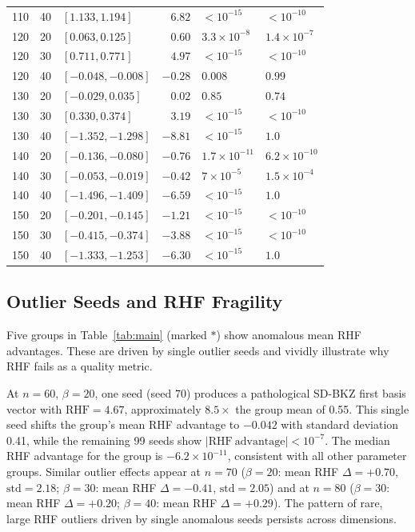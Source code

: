 \documentclass[journal=cic,version=preprint]{iacrj}
\begin{document}
\begin{table}[tbp]
\begin{tabular}{rrlrll}
110 & 40 & $[1.133, 1.194]$ & $6.82$  & $<10^{-15}$ & $<10^{-10}$ \\
120 & 20 & $[0.063, 0.125]$ & $0.60$  & $3.3\times 10^{-8}$ & $1.4\times 10^{-7}$ \\
120 & 30 & $[0.711, 0.771]$ & $4.97$  & $<10^{-15}$ & $<10^{-10}$ \\
120 & 40 & $[-0.048, -0.008]$ & $-0.28$ & $0.008$ & $0.99$ \\
130 & 20 & $[-0.029, 0.035]$ & $0.02$  & $0.85$ & $0.74$ \\
130 & 30 & $[0.330, 0.374]$ & $3.19$  & $<10^{-15}$ & $<10^{-10}$ \\
130 & 40 & $[-1.352, -1.298]$ & $-8.81$ & $<10^{-15}$ & $1.0$ \\
140 & 20 & $[-0.136, -0.080]$ & $-0.76$ & $1.7\times 10^{-11}$ & $6.2\times 10^{-10}$ \\
140 & 30 & $[-0.053, -0.019]$ & $-0.42$ & $7\times 10^{-5}$ & $1.5\times 10^{-4}$ \\
140 & 40 & $[-1.496, -1.409]$ & $-6.59$ & $<10^{-15}$ & $1.0$ \\
150 & 20 & $[-0.201, -0.145]$ & $-1.21$ & $<10^{-15}$ & $<10^{-10}$ \\
150 & 30 & $[-0.415, -0.374]$ & $-3.88$ & $<10^{-15}$ & $<10^{-10}$ \\
150 & 40 & $[-1.333, -1.253]$ & $-6.30$ & $<10^{-15}$ & $1.0$ \\
\hline
\end{tabular}
\end{table}

\subsection{Outlier Seeds and RHF Fragility}
\label{sec:outliers}

Five groups in Table~\ref{tab:main} (marked $\ast$) show anomalous mean RHF advantages. These are driven by single outlier seeds and vividly illustrate why RHF fails as a quality metric.

At $n=60$, $\beta=20$, one seed (seed 70) produces a pathological SD-BKZ first basis vector with $\mathrm{RHF}=4.67$, approximately $8.5\times$ the group mean of 0.55. This single seed shifts the group's mean RHF advantage to $-0.042$ with standard deviation 0.41, while the remaining 99 seeds show $|\mathrm{RHF\ advantage}|<10^{-7}$. The median RHF advantage for the group is $-6.2\times 10^{-11}$, consistent with all other parameter groups. Similar outlier effects appear at $n=70$ ($\beta=20$: mean RHF $\Delta=+0.70$, $\mathrm{std}=2.18$; $\beta=30$: mean RHF $\Delta=-0.41$, $\mathrm{std}=2.05$) and at $n=80$ ($\beta=30$: mean RHF $\Delta=+0.20$; $\beta=40$: mean RHF $\Delta=+0.29$). The pattern of rare, large RHF outliers driven by single anomalous seeds persists across dimensions.
\end{document}
